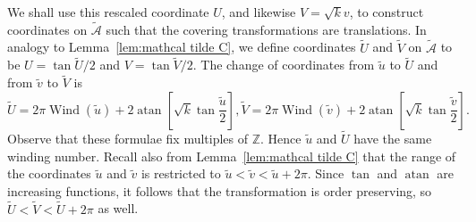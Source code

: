 \documentclass{article}
\numberwithin{equation}{section}
\numberwithin{figure}{section}
\newcommand{\Partial}[2]{\frac{\partial #1}{\partial #2}}
\DeclareMathOperator{\atan}{atan}
\DeclareMathOperator{\Wind}{Wind}
\newcommand{\Z}{\mathbb{Z}}
\newcommand{\R}{\mathbb{R}}
\begin{document}
We shall use this rescaled coordinate $U$, and likewise $V = \sqrt{k} v$, to construct coordinates on $\mathcal{\tilde{A}}$ such that the covering transformations are translations. 
In analogy to Lemma~\ref{lem:mathcal tilde C}, we define coordinates $\tilde{U}$ and $\tilde{V}$ on $\mathcal{\tilde{A}}$ to be $U = \tan \tilde{U}/2$ and $V = \tan \tilde{V}/2$.
The change of coordinates from $\tilde{u}$ to $\tilde{U}$ and from $\tilde{v}$ to $\tilde{V}$ is
\[
\tilde{U} = 2\pi\Wind(\tilde{u}) + 2 \atan \left[ \sqrt{k} \tan \frac{\tilde{u}}{2} \right],
\tilde{V} = 2\pi\Wind(\tilde{v}) + 2 \atan \left[ \sqrt{k} \tan \frac{\tilde{v}}{2} \right].
\]
Observe that these formulae fix multiples of $\Z$.
Hence $\tilde{u}$ and $\tilde{U}$ have the same winding number.
Recall also from Lemma~\ref{lem:mathcal tilde C} that the range of the coordinates $\tilde{u}$ and $\tilde{v}$ is restricted to $\tilde{u} < \tilde{v} < \tilde{u} + 2\pi$.
Since $\tan$ and $\atan$ are increasing functions, it follows that the transformation is order preserving, so $\tilde{U} < \tilde{V} < \tilde{U} + 2\pi$ as well.

\end{document}

